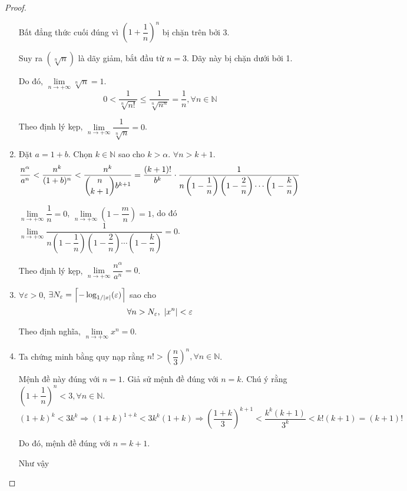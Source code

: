 \documentclass[class=analysis,crop=false]{standalone}
\begin{document}
\begin{proof}
\begin{enumerate}[label = (\roman*)]
            \par Bất đẳng thức cuối đúng vì $\left(1+\dfrac{1}{n}\right)^{n}$ bị chặn trên bởi 3.
            \par Suy ra $(\sqrt[n]{n})$ là dãy giảm, bắt đầu từ $n = 3$. Dãy này bị chặn dưới bởi 1.
            \par Do đó, $\lim\limits_{n\to+\infty}\sqrt[n]{n} = 1$.
            \bigskip
            \[
                0 < \frac{1}{\sqrt[n]{n!}} \le \frac{1}{\sqrt[n]{n^{n}}} = \frac{1}{n}, \forall n\in\mathbb{N}
            \]
            \par Theo định lý kẹp, $\lim\limits_{n\to+\infty}\dfrac{1}{\sqrt[n]{n}} = 0$.
        \item Đặt $a = 1 + b$. Chọn $k\in\mathbb{N}$ sao cho $k > \alpha$. $\forall n > k + 1$.
            \[
                \dfrac{n^{\alpha}}{a^{n}} < \dfrac{n^{k}}{(1 + b)^{n}} < \dfrac{n^{k}}{\dbinom{n}{k+1}b^{k+1}} = \dfrac{(k+1)!}{b^{k}}\cdot\dfrac{1}{n\left(1 - \dfrac{1}{n}\right)\left(1 - \dfrac{2}{n}\right)\cdots\left(1 - \dfrac{k}{n}\right)}
            \]
            \par $\lim\limits_{n\to+\infty}\dfrac{1}{n} = 0$, $\lim\limits_{n\to+\infty}\left(1 - \dfrac{m}{n}\right) = 1$, do đó $\lim\limits_{n\to+\infty}\dfrac{1}{n\left(1 - \dfrac{1}{n}\right)\left(1 - \dfrac{2}{n}\right)\cdots\left(1 - \dfrac{k}{n}\right)} = 0$.
            \par Theo định lý kẹp, $\lim\limits_{n\to+\infty}\dfrac{n^{\alpha}}{a^{n}} = 0$.
        \item $\forall\varepsilon > 0$, $\exists N_{\varepsilon} = \left\lceil{-\log_{1/\left\vert{x}\right\vert}(\varepsilon)}\right\rceil$ sao cho
            \[
                \forall n > N_{\varepsilon},\ \left\vert{x^{n}}\right\vert < \varepsilon
            \]
            \par Theo định nghĩa, $\lim\limits_{n\to+\infty}x^{n} = 0$.
        \item Ta chứng minh bằng quy nạp rằng $n! > \left(\dfrac{n}{3}\right)^{n}, \forall n\in\mathbb{N}$.
            \par Mệnh đề này đúng với $n = 1$. Giả sử mệnh đề đúng với $n = k$. Chú ý rằng $\left(1 + \dfrac{1}{n}\right)^{n} < 3, \forall n\in\mathbb{N}$.
            \[
                (1 + k)^{k} < 3k^{k}\Rightarrow (1 + k)^{1 + k} < 3k^{k}(1 + k) \Rightarrow \left(\dfrac{1 + k}{3}\right)^{k+1} < \dfrac{k^{k}(k+1)}{3^{k}} < k!(k+1) = (k+1)!
            \]
            \par Do đó, mệnh đề đúng với $n = k + 1$.
            \bigskip
            \par Như vậy

\end{enumerate}
\end{proof}
\end{document}
